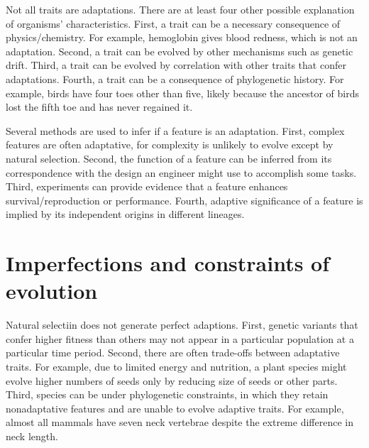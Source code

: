 \documentclass[11pt]{article}
\begin{document}
\begin{sloppypar}
\par

Not all traits are adaptations. 
There are at least four other possible explanation of organisms' characteristics. 
First, a trait can be a necessary consequence of physics/chemistry. 
For example, hemoglobin gives blood redness, which is not an adaptation. 
Second, a trait can be evolved by other mechanisms such as genetic drift. 
Third, a trait can be evolved by correlation with other traits that confer adaptations. 
Fourth, a trait can be a consequence of phylogenetic history. 
For example, birds have four toes other than five, likely because the ancestor of birds lost the fifth toe and has never regained it. 

\par

Several methods are used to infer if a feature is an adaptation. 
First, complex features are often adaptative, for complexity is unlikely to evolve except by natural selection. 
Second, the function of a feature can be inferred from its correspondence with the design an engineer might use to accomplish some tasks. 
Third, experiments can provide evidence that a feature enhances survival/reproduction or performance. 
Fourth, adaptive significance of a feature is implied by its independent origins in different lineages. 

\section{Imperfections and constraints of evolution}
Natural selectiin does not generate perfect adaptions. 
First, genetic variants that confer higher fitness than others may not appear in a particular population at a particular time period. 
Second, there are often trade-offs between adaptative traits. 
For example, due to limited energy and nutrition, a plant species might evolve higher numbers of seeds only by reducing size of seeds or other parts. 
Third, species can be under phylogenetic constraints, in which they retain nonadaptative features and are unable to evolve adaptive traits. 
For example, almost all mammals have seven neck vertebrae despite the extreme difference in neck length. 


\end{sloppypar}
\end{document}
